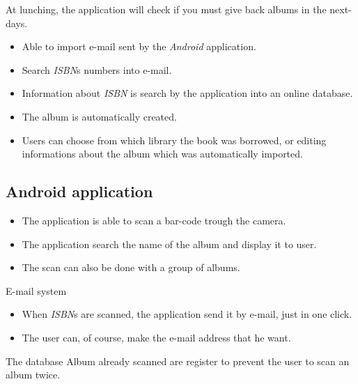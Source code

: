 \documentclass{beamer}
\begin{document}
\begin{frame}
\begin{center}
At lunching, the application will check if you must give back albums in the next-days.
\end{center}
\end{frame}

\begin{frame}
\begin{itemize}
\item Able to import e-mail sent by the \emph{Android} application.
\pause \item Search \emph{ISBN}s numbers into e-mail.
\pause \item Information about \emph{ISBN} is search by the application into an online database.
\pause \item The album is automatically created.
\pause \item Users can choose from which library the book was borrowed, or editing informations about the album which was automatically imported.
\end{itemize}
\end{frame}

\subsection{Android application}
\begin{frame}
\begin{itemize}
\item The application is able to scan a bar-code trough the camera.
\pause \item The application search the name of the album and display it to user.
\pause \item The scan can also be done with a group of albums. 
\end{itemize}
\end{frame}

\begin{frame}
	\begin{block}{E-mail system}
		\begin{itemize}
			\item When \emph{ISBN}s are scanned, the application send it by e-mail, just in one click.
			\pause \item The user can, of course, make the e-mail address that he want.
		\end{itemize}
	\end{block}
	\pause
	\begin{block}{The database}
		\pause
		Album already scanned are register to prevent the user to scan an album twice.
	\end{block}
\end{frame}
\end{document}
